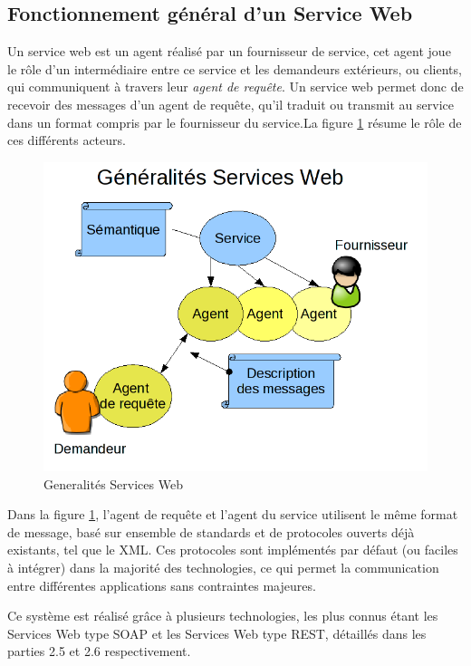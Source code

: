 \subsection{Fonctionnement général d'un Service Web}
Un service web est un agent réalisé par un fournisseur de service, cet agent joue le rôle d'un intermédiaire entre ce service et les demandeurs extérieurs, ou clients, qui communiquent à travers leur \emph{agent de requête}. 
\newline			
Un service web permet donc de recevoir des messages d'un agent de requête, qu'il traduit ou transmit au service dans un format compris par le fournisseur du service.\newline La figure \ref{Generalite_figure} résume le rôle de ces différents acteurs.
\begin{figure}[h]
	\center
	\includegraphics[scale=0.5]{img/Whatisaserviceweb.png}
	\caption{Generalités Services Web}		
	\label{Generalite_figure}
	\centering
\end{figure}						
\newline
Dans la figure \ref{Generalite_figure}, l'agent de requête et l'agent du service utilisent le même format de message, basé sur ensemble de standards et de protocoles ouverts déjà existants, tel que le XML.
Ces protocoles sont implémentés par défaut (ou faciles à intégrer) dans la majorité des technologies, ce qui permet la communication entre différentes applications sans contraintes majeures. 
	
Ce système est réalisé grâce à plusieurs technologies, les plus connus étant les Services Web type SOAP et les Services Web type REST, détaillés dans les parties 2.5 et 2.6 respectivement.
	
